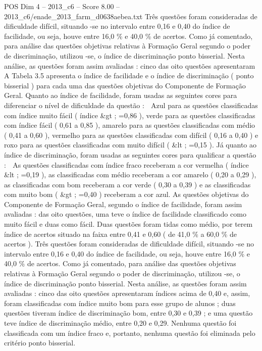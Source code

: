 \begin{textsample}{POS Dim 4 – 2013\_c6 – Score 8.00 – 2013\_c6/enade\_2013\_farm\_d0638aebea.txt}
Três questões foram consideradas de dificuldade difícil, situando -se no intervalo entre 0,16 e 0,40 do índice de facilidade, ou seja, houve entre 16,0 \% e 40,0 \% de acertos.
Como já comentado, para análise das questões objetivas relativas à Formação Geral segundo o poder de discriminação, utilizou -se, o índice de discriminação ponto bisserial.
Nesta análise, as questões foram assim avaliadas : cinco das oito questões apresentaram A Tabela 3.5 apresenta o índice de facilidade e o índice de discriminação ( ponto bisserial ) para cada uma das questões objetivas do Componente de Formação Geral.
Quanto ao índice de facilidade, foram usadas as seguintes cores para diferenciar o nível de dificuldade da questão :  Azul para as questões classificadas com índice muito fácil ( índice \&gt ; =0,86 ), verde para as questões classificadas com índice fácil ( 0,61 a 0,85 ), amarelo para as questões classificadas com médio ( 0,41 a 0,60 ), vermelho para as questões classificadas com difícil ( 0,16 a 0,40 ) e roxo para as questões classificadas com muito difícil ( \&lt ; =0,15 ).
Já quanto ao índice de discriminação, foram usadas as seguintes cores para qualificar a questão :  As questões classificadas com índice fraco receberam a cor vermelha ( índice \&lt ; =0,19 ), as classificadas com médio receberam a cor amarelo ( 0,20 a 0,29 ), as classificadas com bom receberam a cor verde ( 0,30 a 0,39 ) e as classificadas com muito bom ( \&gt ; =0,40 ) receberam a cor azul.
As questões objetivas do Componente de Formação Geral, segundo o índice de facilidade, foram assim avaliadas : das oito questões, uma teve o índice de facilidade classificado como muito fácil e duas como fácil.
Duas questões foram tidas como médio, por terem índice de acertos situado na faixa entre 0,41 e 0,60 ( de 41,0 \% a 60,0 \% de acertos ).
Três questões foram consideradas de dificuldade difícil, situando -se no intervalo entre 0,16 e 0,40 do índice de facilidade, ou seja, houve entre 16,0 \% e 40,0 \% de acertos.
Como já comentado, para análise das questões objetivas relativas à Formação Geral segundo o poder de discriminação, utilizou -se, o índice de discriminação ponto bisserial.
Nesta análise, as questões foram assim avaliadas : cinco das oito questões apresentaram índices acima de 0,40 e, assim, foram classificadas com índice muito bom para esse grupo de alunos ; duas questões tiveram índice de discriminação bom, entre 0,30 e 0,39 ; e uma questão teve índice de discriminação médio, entre 0,20 e 0,29.
Nenhuma questão foi classificada com um índice fraco e, portanto, nenhuma questão foi eliminada pelo critério ponto bisserial.

\end{textsample}
